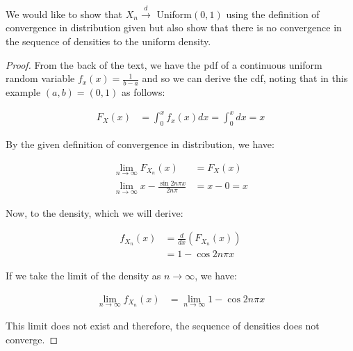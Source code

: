 \documentclass[11pt]{article}
\begin{document}
We would like to show that $X_n \xrightarrow{d}$ Uniform$(0,1)$ using the definition of convergence in distribution given but also show that there is no convergence in the sequence of densities to the uniform density.

\begin{proof}

From the back of the text, we have the pdf of a continuous uniform random variable $f_x(x) = \frac{1}{b-a}$ and so we can derive the cdf, noting that in this example $(a,b) = (0,1)$ as follows:

\begin{align*}
  F_X(x) &= \int_0^x f_x(x) dx = \int_0^x dx = x
\end{align*}

By the given definition of convergence in distribution, we have:

\begin{align*}
  \lim_{n \rightarrow \infty} F_{X_n}(x) &= F_X(x) \\
  \lim_{n \rightarrow \infty} x - \frac{\sin{2 n \pi x}}{2 n \pi} &= x - 0 = x
\end{align*}

Now, to the density, which we will derive:

\begin{align*}
  f_{X_n}(x) &= \frac{d}{dx} \left( F_{X_n} (x) \right) \\
  &= 1 - \cos{2 n \pi x}
\end{align*}

If we take the limit of the density as $n \rightarrow \infty$, we have:

\begin{align*}
  \lim_{n \rightarrow \infty} f_{X_n}(x) &= \lim_{n \rightarrow \infty} 1 - \cos{2 n \pi x}
\end{align*}

This limit does not exist and therefore, the sequence of densities does not converge.

\end{proof}
\end{document}
